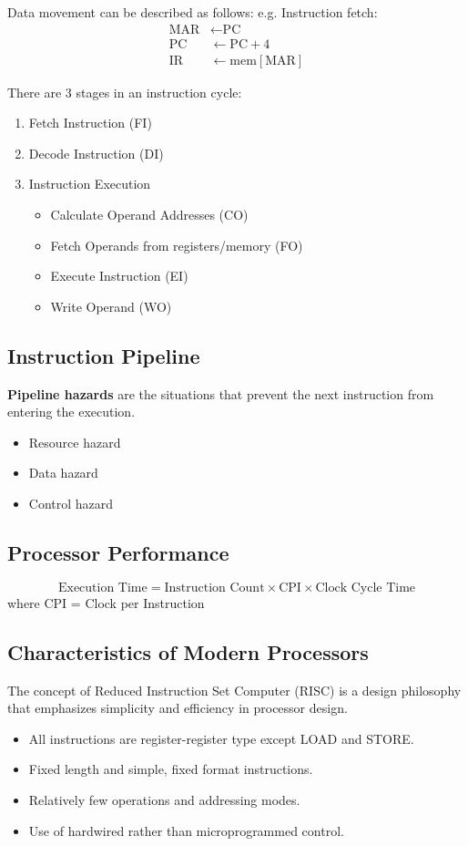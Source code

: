 \documentclass[11pt,a4paper]{article}
\begin{document}
Data movement can be described as follows: e.g. Instruction fetch:
\begin{align*}
\text{MAR} &\leftarrow \text{PC} \\
\text{PC} &\leftarrow \text{PC} + 4 \\
\text{IR} &\leftarrow \text{mem}[\text{MAR}]
\end{align*}

There are 3 stages in an instruction cycle:
\begin{enumerate}
    \item [1. ]Fetch Instruction (FI)
    \item [2. ]Decode Instruction (DI)
    \item [3. ]Instruction Execution
        \begin{itemize}
            \item Calculate Operand Addresses (CO)
            \item Fetch Operands from registers/memory (FO)
            \item Execute Instruction (EI)
            \item Write Operand (WO)
        \end{itemize}
\end{enumerate}

\subsection{Instruction Pipeline}

\textbf{Pipeline hazards} are the situations that prevent the next instruction from entering the execution.
\begin{itemize}
    \item Resource hazard
    \item Data hazard
    \item Control hazard
\end{itemize}

\subsection{Processor Performance}
\[
\text{Execution Time} = \text{Instruction Count} \times \text{CPI} \times \text{Clock Cycle Time}
\]
where CPI = Clock per Instruction

\subsection{Characteristics of Modern Processors}
The concept of Reduced Instruction Set Computer (RISC) is a design philosophy that emphasizes simplicity and efficiency in processor design.
\begin{itemize}
    \item All instructions are register-register type except LOAD and STORE.
    \item Fixed length and simple, fixed format instructions.
    \item Relatively few operations and addressing modes.
    \item Use of hardwired rather than microprogrammed control.
\end{itemize}
\end{document}
